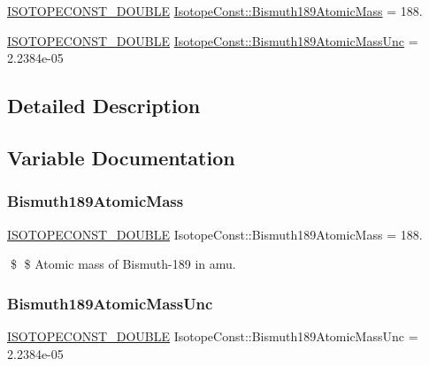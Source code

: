 \begin{DoxyCompactItemize}
\item 
\mbox{\hyperlink{group___isotope_const-_macros_ga8f45a7272ce02c0b4c65c44636ed719a}{I\+S\+O\+T\+O\+P\+E\+C\+O\+N\+S\+T\+\_\+\+D\+O\+U\+B\+LE}} \mbox{\hyperlink{group___isotope_const-_bismuth-_bi189_gac4ab7182dadec8dc1dda62ea08ccde51}{Isotope\+Const\+::\+Bismuth189\+Atomic\+Mass}} = 188.
\item 
\mbox{\hyperlink{group___isotope_const-_macros_ga8f45a7272ce02c0b4c65c44636ed719a}{I\+S\+O\+T\+O\+P\+E\+C\+O\+N\+S\+T\+\_\+\+D\+O\+U\+B\+LE}} \mbox{\hyperlink{group___isotope_const-_bismuth-_bi189_gaeb9d741e6e46b0500ca570fe8f8e6654}{Isotope\+Const\+::\+Bismuth189\+Atomic\+Mass\+Unc}} = 2.\+2384e-\/05
\end{DoxyCompactItemize}


\subsection{Detailed Description}


\subsection{Variable Documentation}
\mbox{\label{group___isotope_const-_bismuth-_bi189_gac4ab7182dadec8dc1dda62ea08ccde51}} 
\subsubsection{\texorpdfstring{Bismuth189\+Atomic\+Mass}{Bismuth189AtomicMass}}
{\footnotesize\ttfamily \mbox{\hyperlink{group___isotope_const-_macros_ga8f45a7272ce02c0b4c65c44636ed719a}{I\+S\+O\+T\+O\+P\+E\+C\+O\+N\+S\+T\+\_\+\+D\+O\+U\+B\+LE}} Isotope\+Const\+::\+Bismuth189\+Atomic\+Mass = 188.}

\$ \$ Atomic mass of Bismuth-\/189 in amu. \mbox{\label{group___isotope_const-_bismuth-_bi189_gaeb9d741e6e46b0500ca570fe8f8e6654}} 
\subsubsection{\texorpdfstring{Bismuth189\+Atomic\+Mass\+Unc}{Bismuth189AtomicMassUnc}}
{\footnotesize\ttfamily \mbox{\hyperlink{group___isotope_const-_macros_ga8f45a7272ce02c0b4c65c44636ed719a}{I\+S\+O\+T\+O\+P\+E\+C\+O\+N\+S\+T\+\_\+\+D\+O\+U\+B\+LE}} Isotope\+Const\+::\+Bismuth189\+Atomic\+Mass\+Unc = 2.\+2384e-\/05}

